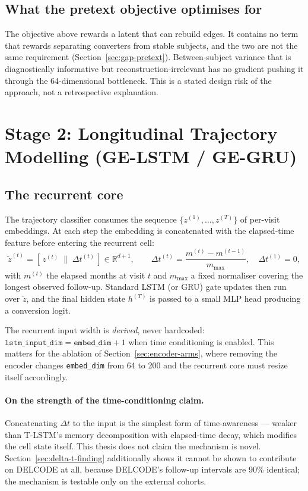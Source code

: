 \subsection{What the pretext objective optimises for}

The objective above rewards a latent that can rebuild edges. It contains no term that
rewards separating converters from stable subjects, and the two are not the same
requirement (Section~\ref{sec:gap-pretext}). Between-subject variance that is
diagnostically informative but reconstruction-irrelevant has no gradient pushing it through
the 64-dimensional bottleneck. This is a stated design risk of the approach, not a
retrospective explanation.

\section{Stage 2: Longitudinal Trajectory Modelling (GE-LSTM / GE-GRU)}
\label{sec:gelstm-method}

\subsection{The recurrent core}

The trajectory classifier consumes the sequence $\{z^{(1)}, \ldots, z^{(T)}\}$ of per-visit
embeddings. At each step the embedding is concatenated with the elapsed-time feature before
entering the recurrent cell:
\[
  \tilde{z}^{(t)} = \left[\, z^{(t)} \;\|\; \Delta t^{(t)} \,\right] \in \mathbb{R}^{d+1},
  \qquad
  \Delta t^{(t)} = \frac{m^{(t)} - m^{(t-1)}}{m_{\max}},\quad \Delta t^{(1)} = 0,
\]
with $m^{(t)}$ the elapsed months at visit $t$ and $m_{\max}$ a fixed normaliser covering
the longest observed follow-up. Standard LSTM (or GRU) gate updates then run over
$\tilde{z}$, and the final hidden state $h^{(T)}$ is passed to a small MLP head producing a
conversion logit.

The recurrent input width is \emph{derived}, never hardcoded:
$\texttt{lstm\_input\_dim} = \texttt{embed\_dim} + 1$ when time conditioning is enabled.
This matters for the ablation of Section~\ref{sec:encoder-arms}, where removing the encoder
changes \texttt{embed\_dim} from 64 to 200 and the recurrent core must resize itself
accordingly.

\paragraph{On the strength of the time-conditioning claim.} Concatenating $\Delta t$ to the
input is the simplest form of time-awareness --- weaker than T-LSTM's memory decomposition
with elapsed-time decay, which modifies the cell state itself. This thesis does not claim
the mechanism is novel. Section~\ref{sec:delta-t-finding} additionally shows it cannot be
shown to contribute on DELCODE at all, because DELCODE's follow-up intervals are 90\%
identical; the mechanism is testable only on the external cohorts.

